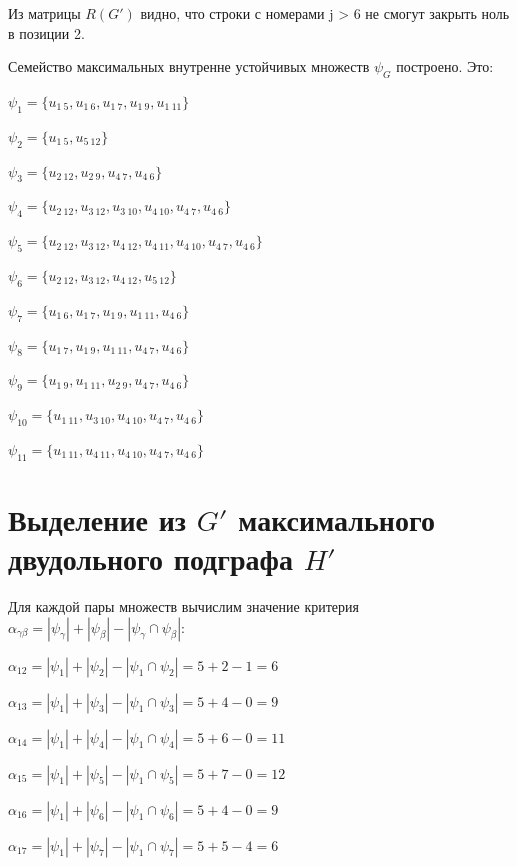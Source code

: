 \documentclass{article}
\begin{document}
Из матрицы $R(G')$ видно, что строки с номерами j > 6 не смогут закрыть ноль в позиции 2.



Семейство максимальных внутренне устойчивых множеств $\psi_G$ построено. Это:

$\psi_{1} = \{u_{1\ 5},u_{1\ 6},u_{1\ 7},u_{1\ 9},u_{1\ 11}\}$

$\psi_{2} = \{u_{1\ 5},u_{5\ 12}\}$

$\psi_{3} = \{u_{2\ 12},u_{2\ 9},u_{4\ 7},u_{4\ 6}\}$

$\psi_{4} = \{u_{2\ 12},u_{3\ 12},u_{3\ 10},u_{4\ 10},u_{4\ 7},u_{4\ 6}\}$

$\psi_{5} = \{u_{2\ 12},u_{3\ 12},u_{4\ 12},u_{4\ 11},u_{4\ 10},u_{4\ 7},u_{4\ 6}\}$

$\psi_{6} = \{u_{2\ 12},u_{3\ 12},u_{4\ 12},u_{5\ 12}\}$

$\psi_{7} = \{u_{1\ 6},u_{1\ 7},u_{1\ 9},u_{1\ 11},u_{4\ 6}\}$

$\psi_{8} = \{u_{1\ 7},u_{1\ 9},u_{1\ 11},u_{4\ 7},u_{4\ 6}\}$

$\psi_{9} = \{u_{1\ 9},u_{1\ 11},u_{2\ 9},u_{4\ 7},u_{4\ 6}\}$

$\psi_{10} = \{u_{1\ 11},u_{3\ 10},u_{4\ 10},u_{4\ 7},u_{4\ 6}\}$

$\psi_{11} = \{u_{1\ 11},u_{4\ 11},u_{4\ 10},u_{4\ 7},u_{4\ 6}\}$

\section{Выделение из $G'$ максимального двудольного подграфа $H'$}

Для каждой пары множеств вычислим значение критерия $\alpha_{\gamma\beta} = |\psi_\gamma| + |\psi_\beta| - |\psi_\gamma \cap \psi_\beta|$:

$\alpha_{12} = |\psi_{1}| + |\psi_{2}| - |\psi_{1} \cap \psi_{2}| = 5 + 2 - 1 = 6$

$\alpha_{13} = |\psi_{1}| + |\psi_{3}| - |\psi_{1} \cap \psi_{3}| = 5 + 4 - 0 = 9$

$\alpha_{14} = |\psi_{1}| + |\psi_{4}| - |\psi_{1} \cap \psi_{4}| = 5 + 6 - 0 = 11$

$\alpha_{15} = |\psi_{1}| + |\psi_{5}| - |\psi_{1} \cap \psi_{5}| = 5 + 7 - 0 = 12$

$\alpha_{16} = |\psi_{1}| + |\psi_{6}| - |\psi_{1} \cap \psi_{6}| = 5 + 4 - 0 = 9$

$\alpha_{17} = |\psi_{1}| + |\psi_{7}| - |\psi_{1} \cap \psi_{7}| = 5 + 5 - 4 = 6$
\end{document}
